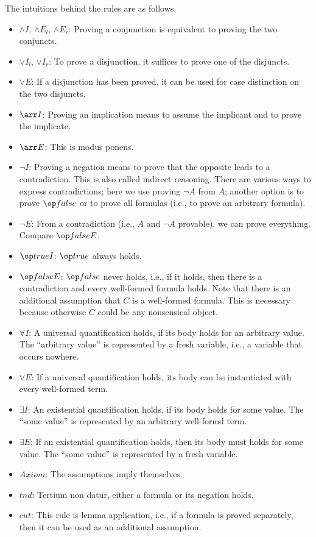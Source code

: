 The intuitions behind the rules are as follows.
\begin{itemize}
 \item $\wedge I$, $\wedge E_l$, $\wedge E_r$: Proving a conjunction is equivalent to proving the two conjuncts.
 \item $\vee I_l$, $\vee I_r$: To prove a disjunction, it suffices to prove one of the disjuncts.
 \item $\vee E$: If a disjunction has been proved, it can be used for case distinction on the two disjuncts.
 \item $\arr I$: Proving an implication means to assume the implicant and to prove the implicate.
 \item $\arr E$: This is modus ponens.
 \item $\neg I$: Proving a negation means to prove that the opposite leads to a contradiction. This is also called indirect reasoning. There are various ways to express contradictions; here we use proving $\neg A$ from $A$; another option is to prove $\false$ or to prove all formulas (i.e., to prove an arbitrary formula).
 \item $\neg E$: From a contradiction (i.e., $A$ and $\neg A$ provable), we can prove everything. Compare $\false E$.
 \item $\true I$: $\true$ always holds.
 \item $\false E$: $\false$ never holds, i.e., if it holds, then there is a contradiction and every well-formed formula holds. Note that there is an additional assumption that $C$ is a well-formed formula. This is necessary because otherwise $C$ could be any nonsensical object.
 \item $\forall I$: A universal quantification holds, if its body holds for an arbitrary value. The ``arbitrary value'' is represented by a fresh variable, i.e., a variable that occurs nowhere.
 \item $\forall E$: If a universal quantification holds, its body can be instantiated with every well-formed term.
 \item $\exists I$: An existential quantification holds, if its body holds for some value. The ``some value'' is represented by an arbitrary well-formd term.
 \item $\exists E$: If an existential quantification holds, then its body must holds for some value. The ``some value'' is represented by a fresh variable.
 \item $Axiom$: The assumptions imply themselves.
 \item $tnd$: Tertium non datur, either a formula or its negation holds.
 \item $cut$: This rule is lemma application, i.e., if a formula is proved separately, then it can be used as an additional assumption.
\end{itemize}

